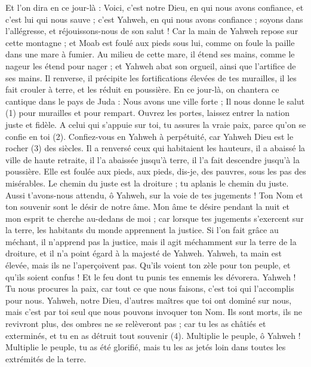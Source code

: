 \begin{multicols}{2}
{Et l'on dira en ce jour-là : Voici, c'est notre Dieu, en qui nous avons confiance, et c’est lui qui nous sauve ; c'est Yahweh, en qui nous avons confiance ; soyons dans l’allégresse, et réjouissons-nous de son salut !
Car la main de Yahweh repose sur cette montagne ; et Moab est foulé aux pieds sous lui, comme on foule la paille dans une mare à fumier.
Au milieu de cette mare, il étend ses mains, comme le nageur les étend pour nager ; et Yahweh abat son orgueil, ainsi que l’artifice de ses mains.
Il renverse, il précipite les fortifications élevées de tes murailles, il les fait crouler à terre, et les réduit en poussière.
\VerseOne{}En ce jour-là, on chantera ce cantique dans le pays de Juda : Nous avons une ville forte ; Il nous donne le salut (1) pour murailles et pour rempart.
Ouvrez les portes, laissez entrer la nation juste et fidèle.
A celui qui s’appuie sur toi, tu assures la vraie paix, parce qu’on se confie en toi (2).
Confiez-vous en Yahweh à perpétuité, car Yahweh Dieu est le rocher (3) des siècles.
Il a renversé ceux qui habitaient les hauteurs, il a abaissé la ville de haute retraite, il l’a abaissée jusqu'à terre, il l’a fait descendre jusqu'à la poussière.
Elle est foulée aux pieds, aux pieds, dis-je, des pauvres, sous les pas des misérables.
Le chemin du juste est la droiture ; tu aplanis le chemin du juste.
Aussi t'avons-nous attendu, ô Yahweh, sur la voie de tes jugements ! Ton Nom et ton souvenir sont le désir de notre âme.
Mon âme te désire pendant la nuit et mon esprit te cherche au-dedans de moi ; car lorsque tes jugements s’exercent sur la terre, les habitants du monde apprennent la justice.
Si l’on fait grâce au méchant, il n’apprend pas la justice, mais il agit méchamment sur la terre de la droiture, et il n’a point égard à la majesté de Yahweh.
Yahweh, ta main est élevée, mais ils ne l’aperçoivent pas. Qu’ils voient ton zèle pour ton peuple, et qu’ils soient confus ! Et le feu dont tu punis tes ennemis les dévorera.
Yahweh ! Tu nous procures la paix, car tout ce que nous faisons, c’est toi qui l’accomplis pour nous.
Yahweh, notre Dieu, d'autres maîtres que toi ont dominé sur nous, mais c'est par toi seul que nous pouvons invoquer ton Nom.
Ils sont morts, ils ne revivront plus, des ombres ne se relèveront pas ; car tu les as châtiés et exterminés, et tu en as détruit tout souvenir (4).
Multiplie le peuple, ô Yahweh ! Multiplie le peuple, tu as été glorifié, mais tu les as jetés loin dans toutes les extrémités de la terre.
}
\end{multicols}

